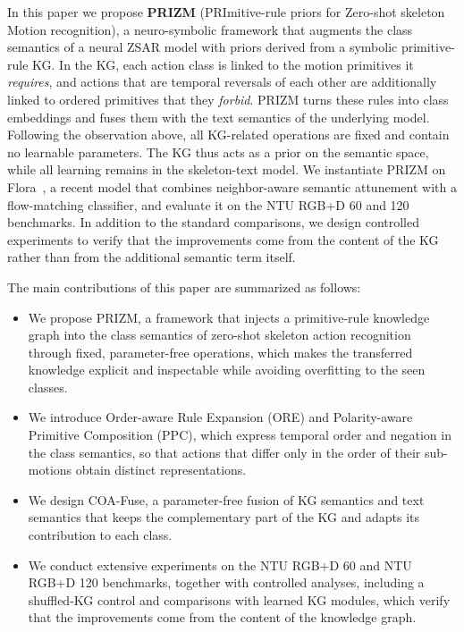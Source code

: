 \documentclass[11pt]{article}
\begin{document}
In this paper we propose \textbf{PRIZM} (PRImitive-rule priors for Zero-shot skeleton Motion recognition), a neuro-symbolic framework that augments the class semantics of a neural ZSAR model with priors derived from a symbolic primitive-rule KG. In the KG, each action class is linked to the motion primitives it \emph{requires}, and actions that are temporal reversals of each other are additionally linked to ordered primitives that they \emph{forbid}. PRIZM turns these rules into class embeddings and fuses them with the text semantics of the underlying model. Following the observation above, all KG-related operations are fixed and contain no learnable parameters. The KG thus acts as a prior on the semantic space, while all learning remains in the skeleton-text model. We instantiate PRIZM on Flora~\cite{flora26}, a recent model that combines neighbor-aware semantic attunement with a flow-matching classifier, and evaluate it on the NTU RGB+D 60 and 120 benchmarks. In addition to the standard comparisons, we design controlled experiments to verify that the improvements come from the content of the KG rather than from the additional semantic term itself.

The main contributions of this paper are summarized as follows:
\begin{itemize}
  \item We propose PRIZM, a framework that injects a primitive-rule knowledge graph into the class semantics of zero-shot skeleton action recognition through fixed, parameter-free operations, which makes the transferred knowledge explicit and inspectable while avoiding overfitting to the seen classes.
  \item We introduce Order-aware Rule Expansion (ORE) and Polarity-aware Primitive Composition (PPC), which express temporal order and negation in the class semantics, so that actions that differ only in the order of their sub-motions obtain distinct representations.
  \item We design COA-Fuse, a parameter-free fusion of KG semantics and text semantics that keeps the complementary part of the KG and adapts its contribution to each class.
  \item We conduct extensive experiments on the NTU RGB+D 60 and NTU RGB+D 120 benchmarks, together with controlled analyses, including a shuffled-KG control and comparisons with learned KG modules, which verify that the improvements come from the content of the knowledge graph.
\end{itemize}
\end{document}
